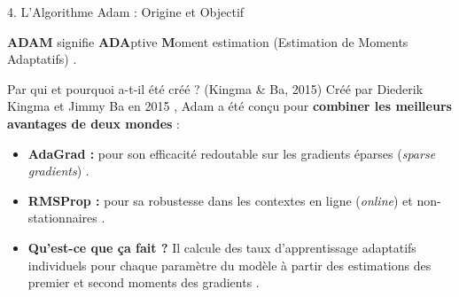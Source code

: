 \documentclass{beamer}
\begin{document}
\begin{frame}{4. L'Algorithme Adam : Origine et Objectif}
    \begin{definition}
        \textbf{ADAM} signifie \textbf{ADA}ptive \textbf{M}oment estimation (Estimation de Moments Adaptatifs) \cite{kingma2014adam}.
    \end{definition}

    \begin{block}{Par qui et pourquoi a-t-il été créé ? (Kingma \& Ba, 2015)}
        Créé par Diederik Kingma et Jimmy Ba en 2015 \cite{kingma2014adam}, Adam a été conçu pour \textbf{combiner les meilleurs avantages de deux mondes} :
        \begin{itemize}
            \item \textbf{AdaGrad :} pour son efficacité redoutable sur les gradients éparses (\emph{sparse gradients}) \cite{kingma2014adam}.
            \item \textbf{RMSProp :} pour sa robustesse dans les contextes en ligne (\emph{online}) et non-stationnaires \cite{kingma2014adam}.
        \end{itemize}
    \end{block}

    \begin{itemize}
        \item \textbf{Qu'est-ce que ça fait ?} Il calcule des taux d'apprentissage adaptatifs individuels pour chaque paramètre du modèle à partir des estimations des premier et second moments des gradients \cite{kingma2014adam}.
    \end{itemize}
\end{frame}
\end{document}
